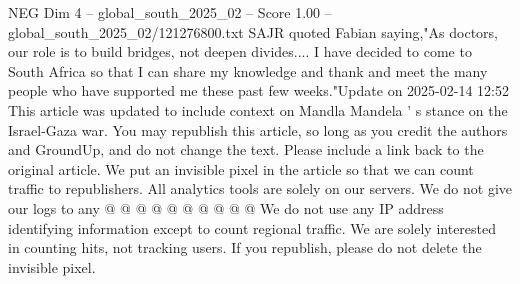 \begin{textsample}{NEG Dim 4 – global\_south\_2025\_02 – Score 1.00 – global\_south\_2025\_02/121276800.txt}
SAJR quoted Fabian saying,"As doctors, our role is to build bridges, not deepen divides....
I have decided to come to South Africa so that I can share my knowledge and thank and meet the many people who have supported me these past few weeks."Update on 2025-02-14 12:52 This article was updated to include context on Mandla Mandela ' s stance on the Israel-Gaza war.
You may republish this article, so long as you credit the authors and GroundUp, and do not change the text.
Please include a link back to the original article.
We put an invisible pixel in the article so that we can count traffic to republishers.
All analytics tools are solely on our servers.
We do not give our logs to any @ @ @ @ @ @ @ @ @ @ We do not use any IP address identifying information except to count regional traffic.
We are solely interested in counting hits, not tracking users.
If you republish, please do not delete the invisible pixel.

\end{textsample}
